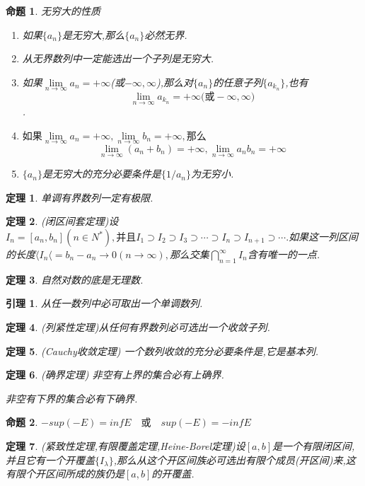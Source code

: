\documentclass[UTF8]{ctexart}
\newtheorem{theorem}{定理}[section]
\newtheorem{pro}{命题}[section]
\newtheorem{lemma}{引理}[section]
\begin{document}
\begin{pro}无穷大的性质
	\begin{enumerate}
		\item 如果$\{a_n\}$是无穷大,那么$\{a_n\}$必然无界.
		\item 从无界数列中一定能选出一个子列是无穷大.
		\item 如果$\lim\limits_{n\to\infty}a_n=+\infty$(或$-\infty,\infty$),那么对$\{a_n\}$的任意子列$\{a_{k_n}\}$,也有\[\lim\limits_{n\to\infty}a_{k_n}=+\infty\mbox{(或}-\infty,\infty)\].
		\item $\mbox{如果}\lim\limits_{n\to\infty}a_n=+\infty,\lim\limits_{n\to\infty}b_n=+\infty,\mbox{那么}$\[\lim\limits_{n\to\infty}(a_n+b_n)=+\infty,\lim\limits_{n\to\infty}a_nb_n=+\infty\]
		\item $\{a_n\}$是无穷大的充分必要条件是$\{1/a_n\}$为无穷小.
	\end{enumerate}
\end{pro}
\begin{theorem}
	单调有界数列一定有极限.
\end{theorem}
\begin{theorem}
	(闭区间套定理)设$I_n=[a_n,b_n](n\in N^*),\mbox{并且}I_1\supset I_2 \supset I_3 \supset \cdots \supset I_n\supset I_{n+1}\supset \cdots.$如果这一列区间的长度$\langle I_n\langle=b_n-a_n\to 0(n\to \infty),$那么交集$\bigcap\limits_{n=1}^\infty I_n$含有唯一的一点.
\end{theorem}
\begin{theorem}
	自然对数的底是无理数.
\end{theorem}
\begin{lemma}
	从任一数列中必可取出一个单调数列.
\end{lemma}
\begin{theorem}
	(列紧性定理)从任何有界数列必可选出一个收敛子列.
\end{theorem}
\begin{theorem}(Cauchy收敛定理)
	一个数列收敛的充分必要条件是,它是基本列.
\end{theorem}
\begin{theorem}(确界定理)
	非空有上界的集合必有上确界.
	
	非空有下界的集合必有下确界.
\end{theorem}
\begin{pro}
	$-sup(-E)=inf E\quad \mbox{或}\quad sup(-E)=-infE$ 
\end{pro}
\begin{theorem}
		(紧致性定理,有限覆盖定理,Heine-Borel定理)设$[a,b]$是一个有限闭区间,并且它有一个开覆盖$\{I_\lambda\}$,那么从这个开区间族必可选出有限个成员(开区间)来,这有限个开区间所成的族仍是$[a,b]$的开覆盖.
\end{theorem}	
\end{document}
